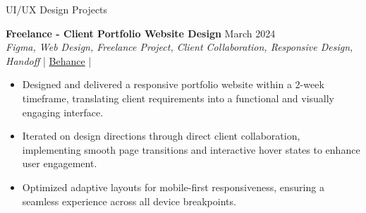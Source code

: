 \documentclass{resume}
\begin{document}
\begin{rSection}{UI/UX Design Projects}
    \item \textbf{Freelance - Client Portfolio Website Design} \hfill March 2024\\
    {\small \textit{Figma, Web Design, Freelance Project, Client Collaboration, Responsive Design, Handoff}} \hfill | \href{https://www.behance.net/gallery/251702571/UXUI-Personal-Portfolio-Website}{Behance} |
    \begin{itemize}
        \itemsep -3pt {}
        \item Designed and delivered a responsive portfolio website within a 2-week timeframe, translating client requirements into a functional and visually engaging interface.
        \item Iterated on design directions through direct client collaboration, implementing smooth page transitions and interactive hover states to enhance user engagement.
        \item Optimized adaptive layouts for mobile-first responsiveness, ensuring a seamless experience across all device breakpoints.
    \end{itemize}

\end{rSection}

\newpage
\end{document}
